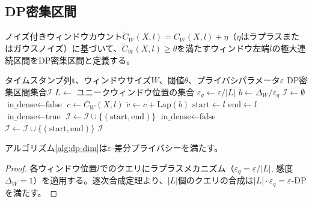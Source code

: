 \subsection{DP密集区間}

\begin{definition}\label{def:dp-dense}
ノイズ付きウィンドウカウント$\tilde{C}_W(X, l) = C_W(X, l) + \eta$（$\eta$はラプラスまたはガウスノイズ）に基づいて、$\tilde{C}_W(X, l) \geq \theta$を満たすウィンドウ左端$l$の極大連続区間をDP密集区間と定義する。
\end{definition}

\begin{algorithm}[t]
\caption{DP-DIM: 差分プライバシー密集区間検出}\label{alg:dp-dim}
\begin{algorithmic}[1]
\REQUIRE タイムスタンプ列$\mathbf{t}$、ウィンドウサイズ$W$、閾値$\theta$、プライバシパラメータ$\varepsilon$
\ENSURE DP密集区間集合$\mathcal{I}$
\STATE $L \leftarrow$ ユニークウィンドウ位置の集合
\STATE $\varepsilon_q \leftarrow \varepsilon / |L|$ \hfill{}
\STATE $b \leftarrow \Delta_W / \varepsilon_q$ \hfill{}
\STATE $\mathcal{I} \leftarrow \emptyset$
\STATE $\text{in\_dense} \leftarrow \text{false}$
  \STATE $c \leftarrow C_W(X, l)$ \hfill{}
  \STATE $\tilde{c} \leftarrow c + \text{Lap}(b)$ \hfill{}
      \STATE $\text{start} \leftarrow l$
    \ENDIF
    \STATE $\text{end} \leftarrow l$
    \STATE $\text{in\_dense} \leftarrow \text{true}$
  \ELSE
      \STATE $\mathcal{I} \leftarrow \mathcal{I} \cup \{(\text{start}, \text{end})\}$
    \ENDIF
    \STATE $\text{in\_dense} \leftarrow \text{false}$
  \ENDIF
\ENDFOR
{}
  \STATE $\mathcal{I} \leftarrow \mathcal{I} \cup \{(\text{start}, \text{end})\}$
\ENDIF
\RETURN $\mathcal{I}$
\end{algorithmic}
\end{algorithm}

\begin{theorem}[DP-DIMのプライバシー保証]\label{thm:dp-dim-privacy}
アルゴリズム\ref{alg:dp-dim}は$\varepsilon$-差分プライバシーを満たす。
\end{theorem}

\begin{proof}
各ウィンドウ位置$l$でのクエリにラプラスメカニズム（$\varepsilon_q = \varepsilon/|L|$, 感度$\Delta_W = 1$）を適用する。逐次合成定理より、$|L|$個のクエリの合成は$|L| \cdot \varepsilon_q = \varepsilon$-DPを満たす。
\end{proof}

